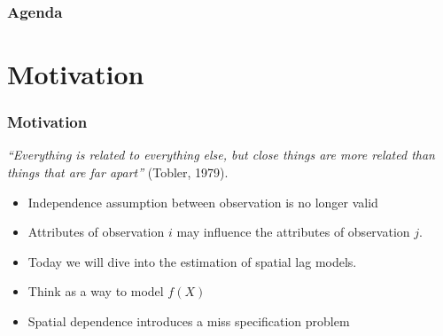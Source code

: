 \documentclass[
  shownotes,
  xcolor={svgnames},
  hyperref={colorlinks,citecolor=DarkBlue,linkcolor=DarkRed,urlcolor=DarkBlue}
  ]{beamer}
\begin{document}

\begin{frame}
\frametitle{Agenda}

\tableofcontents

\end{frame}




\section{Motivation }
\begin{frame}[fragile]
\frametitle{Motivation}


{\it “Everything is related to everything else, but close things are more related than things that are far apart”} (Tobler, 1979).

\bigskip

\begin{itemize}
  
  \item Independence assumption between observation is no longer valid
  \medskip
  \item Attributes of observation $i$  may influence the attributes of observation $j$.
  \medskip
  \item Today we will dive into the estimation of spatial lag models.
  \medskip
  \item Think as a way to model $f(X)$
  \medskip
  \item Spatial dependence introduces a miss specification problem
\end{itemize}



\end{frame}
\end{document}

